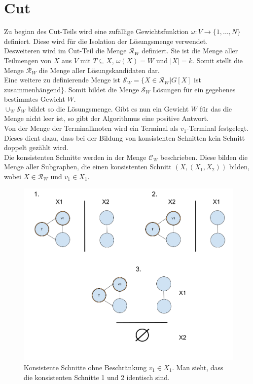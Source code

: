 \section{Cut}
\label{sec:st_cut}
Zu beginn des Cut-Teils wird eine zufällige Gewichtsfunktion $\omega:V\rightarrow \{1,\dots,N\}$ definiert. Diese wird für die Isolation der Lösungsmenge verwendet.\\
Desweiteren wird im Cut-Teil die Menge $\mathcal{R}_W$ definiert. Sie ist die Menge aller Teilmengen von $X$ aus $V$ mit $T \subseteq X$, $\omega(X)=W$ und $|X|=k$. Somit stellt die Menge $\mathcal{R}_W$ die Menge aller Lösungskandidaten dar.\\
Eine weitere zu definierende Menge ist $\mathcal{S}_W=\{X \in \mathcal{R}_W | G[X]$ ist zusammenhängend$\}$. Somit bildet die Menge $\mathcal{S}_W$ Lösungen für ein gegebenes bestimmtes Gewicht $W$.\\
$\cup_W \mathcal{S}_W$ bildet so die Lösungsmenge. Gibt es nun ein Gewicht $W$ für das die Menge nicht leer ist, so gibt der Algorithmus eine positive Antwort.\\
Von der Menge der Terminalknoten wird ein Terminal als $v_1$-Terminal festgelegt. Dieses dient dazu, dass bei der Bildung von konsistenten Schnitten kein Schnitt doppelt gezählt wird.\\
Die konsistenten Schnitte werden in der Menge  $\mathcal{C}_W$ beschrieben. Diese bilden die Menge aller Subgraphen, die einen konsistenten Schnitt $(X,(X_1,X_2))$ bilden, wobei $X\in \mathcal{R}_W$ und $v_1 \in X_1$.
\begin{figure}
\label{fig:st_cut}
  \centering
    \includegraphics[width=1.0\textwidth]{./imgs/terminal_v1.png}
  	\caption{Konsistente Schnitte ohne Beschränkung $v_1 \in X_1$. Man sieht, dass die konsistenten Schnitte 1 und 2 identisch sind.}
\end{figure}

